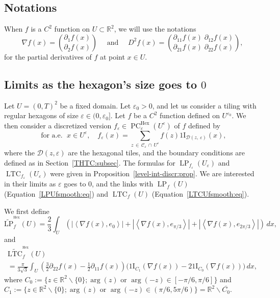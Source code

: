 \documentclass[10pt]{amsart}
\theoremstyle{definition}\newtheorem{defi}[theo]{Definition}\newtheorem{rema}[theo]{Remark}\newtheorem{exam}[theo]{Example}\newtheorem{exem}[theo]{Example}\newtheorem{nota}[theo]{Notation}
\newcommand{\R}{\mathbb{R}}
\newcommand{\ind}{{1\!\!\mathrm{I}}}
\newcommand{\eps}{\varepsilon}
\DeclareMathOperator{\LTC}{LTC}
\DeclareMathOperator{\LP}{LP}
\DeclareMathOperator{\PC}{PC}
\DeclareMathOperator{\Hex}{Hex}
\newcommand{\tLP}{\widetilde{\mathrm{LP}}}
\newcommand{\tLTC}{\widetilde{\mathrm{LTC}}}
\newcommand{\calC}{\mathcal{C}}
\newcommand{\calD}{\mathcal{D}}
\begin{document}
\subsection*{Notations}
When $f$ is a $C^2$ function on $U\subset\R^2$, we will use the notations
\[
\nabla f(x) = 
\binom{\partial_1 f(x)}{\partial_2
f(x)} \quad \text{ and } \quad D^2f(x) =
 \binom{\partial_{11}
f(x) \; \partial_{12} f(x)}{
\partial_{21} f(x) \; \partial_{22}
f(x)},
\]
for the partial derivatives of $f$ at point $x\in U$.

\subsection{Limits as the hexagon's size goes to \texorpdfstring{$0$}{0}}

Let $U=(0,T)^2$ be a fixed domain. Let $\eps_0>0$, and let us consider a tiling with regular hexagons of size $\eps \in (0,\eps_0]$. Let $f$ be a $C^2$ function defined on $U^{\eps_0}$. We then consider a discretized version $f_\eps \in \PC^{\Hex}_\eps(U^{\eps})$ of $f$ defined by
\begin{equation}\label{disc:hexa}
\text{ for a.e. }\;x\in U^{\eps}, \quad f_\varepsilon(x) =\sum_{z\,\in\,\calC_\eps\,\cap\,U^{\eps}} f(z)
\ind_{\calD(z,\,\eps)}(x),
\end{equation}
where the $\calD(z,\eps)$ are the hexagonal tiles, and the boundary conditions are defined as in Section~\ref{THTC:subsec}. The formulas for $\LP_{f_\eps}(U_\eps)$ and $\LTC_{f_\eps}(U_\eps)$ were given in Proposition~\ref{level-int-discr:prop}. We are interested in their limits as $\eps$ goes to $0$, and the links with $\LP_f (U)$ (Equation~\eqref{LPUfsmooth:eq}) and $\LTC_f (U)$ (Equation~\eqref{LTCUfsmooth:eq}).



We first define
\begin{equation}\label{LPHex}
\tLP_{f}^{^{\Hex}}(U)=\frac{2}{3} \int_U \left(\left|\left\langle
\nabla f(x),e_0\right\rangle \right| +\left|\left\langle \nabla f(x),e_{\pi/3}\right\rangle \right| +\left|\left\langle
\nabla f(x),e_{2\pi/3} \right\rangle\right| \right) \, dx,
\end{equation}
and
\begin{multline}\label{LTCHex}
\tLTC_{f}^{^{\Hex}}(U)\\
=\frac{\pi}{3\sqrt{3}} \int_U \left(\frac{3}{2}\partial_{22}f(x)-\frac{1}{2}\partial_{11}f(x)\right)\big(\ind_{C_1}(\nabla f(x))-2\ind_{C_0}(\nabla f(x))\big) \, dx,
\end{multline}
where $C_0:=\{z\in\R^2\smallsetminus\{0\}; \arg(z) \text{ or } \arg(-z) \in [-\pi/6,\pi/6]\}$ and $C_1:=\{z\in\R^2\smallsetminus\{0\}; \arg(z) \text{ or } \arg(-z) \in (\pi/6,5\pi/6)\}=\R^2\smallsetminus\overline{C_0}$.
\end{document}
